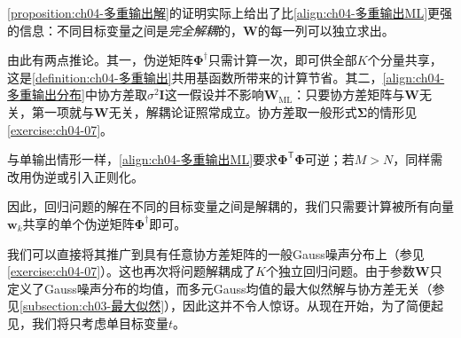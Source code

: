 \documentclass[../../main.tex]{subfiles}
\begin{document}
\begin{remark}
\cref{proposition:ch04-多重输出解}的证明实际上给出了比\eqref{align:ch04-多重输出ML}更强的信息：不同目标变量之间是\emph{完全解耦}的，$\boldsymbol{W}$的每一列可以独立求出。

由此有两点推论。其一，伪逆矩阵$\boldsymbol{\Phi}^{\dagger}$只需计算一次，即可供全部$K$个分量共享，这是\cref{definition:ch04-多重输出}共用基函数所带来的计算节省。其二，\eqref{align:ch04-多重输出分布}中协方差取$\sigma^2\boldsymbol{I}$这一假设并不影响$\boldsymbol{W}_{\mathrm{ML}}$：只要协方差矩阵与$\boldsymbol{W}$无关，第一项就与$\boldsymbol{W}$无关，解耦论证照常成立。协方差取一般形式$\boldsymbol{\Sigma}$的情形见\cref{exercise:ch04-07}。

与单输出情形一样，\eqref{align:ch04-多重输出ML}要求$\boldsymbol{\Phi}^{\mathsf{T}}\boldsymbol{\Phi}$可逆；若$M>N$，同样需改用伪逆或引入正则化。
\end{remark}

因此，回归问题的解在不同的目标变量之间是解耦的，我们只需要计算被所有向量$\boldsymbol{w}_k$共享的单个伪逆矩阵$\boldsymbol{\Phi}^{\dagger}$即可。

我们可以直接将其推广到具有任意协方差矩阵的一般Gauss噪声分布上（参见\cref{exercise:ch04-07}）。这也再次将问题解耦成了$K$个独立回归问题。由于参数$\boldsymbol{W}$只定义了Gauss噪声分布的均值，而多元Gauss均值的最大似然解与协方差无关（参见\cref{subsection:ch03-最大似然}），因此这并不令人惊讶。从现在开始，为了简便起见，我们将只考虑单目标变量$t$。
\end{document}

